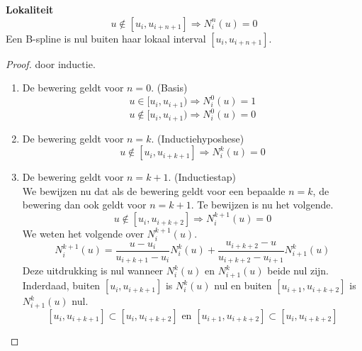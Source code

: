 \documentclass[computergesteund_ontwerp_van_curven_en_oppervlakken.tex]{subfiles}
\begin{document}
\begin{ei}\textbf{Lokaliteit}
\label{bspline_lokaliteit}
\[
u \not\in [u_i,u_{i+n+1}] \Rightarrow N_{i}^{n}(u) = 0
\]
Een B-spline is nul buiten haar lokaal interval $[u_i,u_{i+n+1}]$.

\begin{proof} door inductie.\\
\begin{enumerate}
\item De bewering geldt voor $n=0$. (Basis)
\[
u \in [u_i,u_{i+1}) \Rightarrow N_{i}^{0}(u) = 1
\]
\[
u \not\in [u_i,u_{i+1}) \Rightarrow N_{i}^{0}(u) = 0
\]
\item De bewering geldt voor $n=k$. (Inductiehyposhese)
\[
u \not\in [u_i,u_{i+k+1}] \Rightarrow N_{i}^{k}(u) = 0
\]
\item De bewering geldt voor $n=k+1$. (Inductiestap)\\
We bewijzen nu dat als de bewering geldt voor een bepaalde $n=k$, de bewering dan ook geldt voor $n=k+1$.
Te bewijzen is nu het volgende.
\[
u \not\in [u_i,u_{i+k+2}] \Rightarrow N_{i}^{k+1}(u) = 0
\]
We weten het volgende over $N_{i}^{k+1}(u)$.
\[
N_{i}^{k+1}(u)
= \frac{u-u_i}{u_{i+k+1}-u_i}					N_{i}^{k}(u)
+ \frac{u_{i+k+2}-u}{u_{i+k+2}-u_{i+1}}			N_{i+1}^{k}(u)
\]
Deze uitdrukking is nul wanneer $N_{i}^{k}(u)$ en $N_{i+1}^{k}(u)$ beide nul zijn. Inderdaad, buiten $[u_i,u_{i+k+1}]$ is $N_{i}^{k}(u)$ nul en buiten $[u_{i+1},u_{i+k+2}]$ is $N_{i+1}^{k}(u)$ nul.
\[
[u_i,u_{i+k+1}] \subset [u_i,u_{i+k+2}]
\text{ en }
[u_{i+1},u_{i+k+2}] \subset [u_i,u_{i+k+2}]
\]
\end{enumerate}
\end{proof}
\end{ei}
\end{document}
